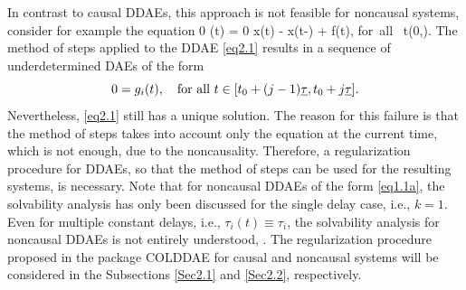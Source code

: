 \documentclass[final,reqno]{siamltex}
\begin{document}
In contrast to causal DDAEs, this approach is not feasible for noncausal systems,
consider for example the equation 
%
\be\label{eq2.1}
  0 \cdot {}(t) = 0 \cdot x(t) - x(t-\tau) + f(t), \quad \mbox{for all } t\in (0,\infty).
\ee
%
The method of steps applied to the DDAE \eqref{eq2.1} results in a sequence of underdetermined DAEs of the form
%
\[
 0 = g_i(t), \quad \mbox{for all } t \in [t_0+(j-1)\underline{\tau},t_0+j\underline{\tau}]. 
\]
%
Nevertheless, \eqref{eq2.1} still has a unique solution. 
The reason for this failure is that the method of steps takes into account only the equation at the current time, which is not enough, 
due to the noncausality. Therefore, a regularization procedure for DDAEs, so that the method of steps can be used for the resulting systems, is 
necessary. Note that for noncausal DDAEs of the form \eqref{eq1.1a}, the solvability analysis has only been discussed for 
the single delay case, i.e., $k=1$. Even for multiple constant delays, i.e., $\tau_i(t) \equiv \tau_i$, the solvability analysis for noncausal DDAEs 
is not entirely understood, \cite{HaM14,Ha15}. 
The regularization procedure proposed in the package COLDDAE for causal and noncausal systems will be considered in the Subsections \ref{Sec2.1} and \ref{Sec2.2}, respectively.
\end{document}
